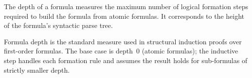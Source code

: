 \begin{remark*}
The depth of a formula measures the maximum number of logical formation steps
required to build the formula from atomic formulas. It corresponds to the height
of the formula's syntactic parse tree.
\end{remark*}

\begin{remark*}
Formula depth is the standard measure used in structural induction proofs over
first-order formulas. The base case is depth~$0$ (atomic formulas); the
inductive step handles each formation rule and assumes the result holds for
sub-formulas of strictly smaller depth.
\end{remark*}
